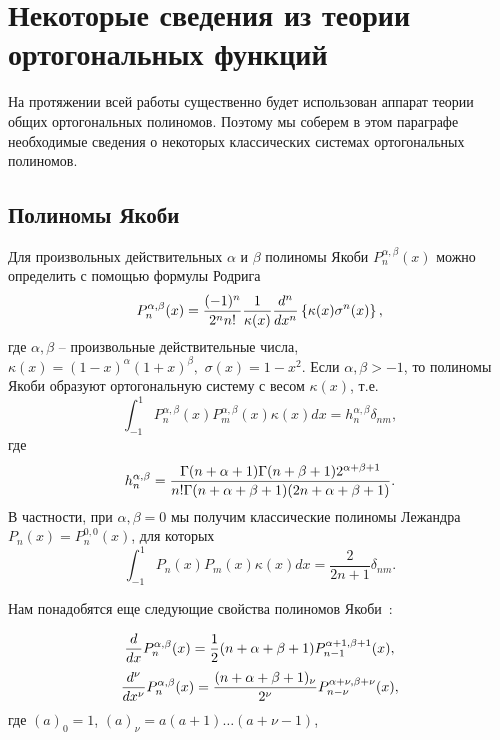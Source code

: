 \chapter{Некоторые сведения из теории ортогональных функций}
На протяжении всей работы существенно будет использован аппарат теории общих ортогональных полиномов. Поэтому мы соберем в этом параграфе необходимые сведения о некоторых классических системах ортогональных полиномов.

\section{Полиномы Якоби}
Для произвольных действительных $\alpha$ и $\beta$ полиномы Якоби  $P_n^{\alpha,\beta}(x)$ можно определить \cite{sobleg-Sege} с помощью формулы Родрига
 \begin{equation}\label{sobleg-2.1}
P_n^{\alpha,\beta}(x) = {(-1)^n\over2^nn!}{1\over\kappa(x)}{d^n\over
dx^n} \left\{\kappa(x)\sigma^n(x)\right\},
\end{equation}
где $\alpha,\beta$ -- произвольные действительные числа, $\kappa(x)=
(1-x)^\alpha(1+x)^\beta,\,\,\sigma(x)=1-x^2$. Если
$\alpha,\beta>-1$, то полиномы Якоби образуют ортогональную
систему с весом $\kappa(x)$, т.е.
\begin{equation}\label{sobleg-2.2}
\int_{-1}^1P_n^{\alpha,\beta}(x)P_m^{\alpha,\beta}(x)\kappa(x)dx =
h_n^{\alpha,\beta}\delta_{nm},
\end{equation}
где
\begin{equation}\label{sobleg-2.3}
h_n^{\alpha,\beta} =
{\Gamma(n+\alpha+1)\Gamma(n+\beta+1)2^{\alpha+\beta+1} \over
n!\Gamma(n+\alpha+\beta+1)(2n+\alpha+\beta+1)}.
\end{equation}
В частности, при $\alpha,\beta=0$ мы получим классические полиномы Лежандра $P_n(x)=P_n^{0,0}(x)$, для которых
\begin{equation*}
\int_{-1}^1P_n(x)P_m(x)\kappa(x)dx = \frac{2}{2n+1}\delta_{nm}.
\end{equation*}



Нам понадобятся еще следующие свойства полиномов Якоби~\cite{sobleg-Sege}:


\begin{equation}\label{sobleg-2.4}
{d\over dx}P_n^{\alpha,\beta}(x) =
{1\over2}(n+\alpha+\beta+1)P_{n-1}^{\alpha+1,\beta+1}(x),
\end{equation}
\begin{equation}\label{sobleg-2.5}
{d^\nu\over dx^\nu}P_n^{\alpha,\beta}(x) =
{(n+\alpha+\beta+1)_\nu\over2^\nu} P_{n-\nu}^{\alpha+\nu,\beta+\nu}(x),
\end{equation}
где $(a)_0=1$, $(a)_\nu=a(a+1)\dots(a+\nu-1)$,

